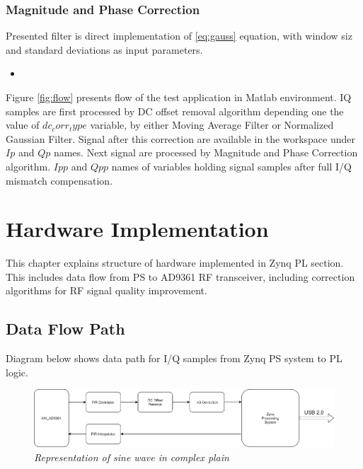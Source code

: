 \documentclass[en,printmode]{mgr}
\begin{document}
	\newpage
	\subsection*{Magnitude and Phase Correction}
		Presented filter is direct implementation of \ref{eq:gauss} equation, with window siz and
		standard deviations as input parameters.
		\begin{itemize}[label={}]
			\item 
		\end{itemize}
		
	Figure \ref{fig:flow} presents flow of the test application in Matlab environment. IQ samples are first
	processed by DC offset removal algorithm depending one the value of $dc_corr_type$ variable, by either
	Moving Average Filter or Normalized Gaussian Filter. Signal after this correction are available in the
	workspace under $Ip$ and $Qp$ names. Next signal are processed by Magnitude and Phase Correction algorithm.
	$Ipp$ and $Qpp$ names of variables holding signal samples after full I/Q mismatch compensation.
		
	
\chapter{Hardware Implementation}
	This chapter explains structure of hardware implemented in Zynq PL section. This includes data flow
	from PS to AD9361 RF transceiver, including correction algorithms for RF signal quality improvement.
	
	\section{Data Flow Path}
	Diagram below shows data path for I/Q samples from Zynq PS system to PL logic.
	\begin{figure}[!htb]
    	\centering
   		\includegraphics[width=\textheight, angle =90]{diag/hdl.png}
    	\caption{\textit{Representation of sine wave in complex plain}}
    	\label{fig:polarplot}
	\end{figure}
	
\end{document}

